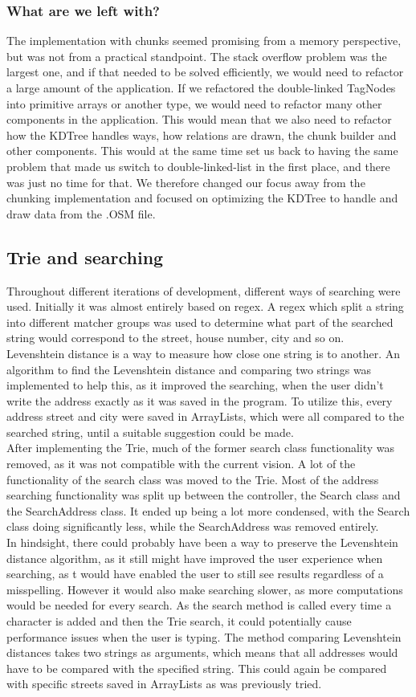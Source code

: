 \subsubsection{What are we left with?}
The implementation with chunks seemed promising from a memory perspective, but was not from a practical standpoint. The stack overflow problem was the largest one, and if that needed to be solved efficiently, we would need to refactor a large amount of the application. If we refactored the double-linked TagNodes into primitive arrays or another type, we would need to refactor many other components in the application. This would mean that we also need to refactor how the KDTree handles ways, how relations are drawn, the chunk builder and other components. This would at the same time set us back to having the same problem that made us switch to double-linked-list in the first place, and there was just no time for that. 
We therefore changed our focus away from the chunking implementation and focused on optimizing the KDTree to handle and draw data from the .OSM file. 
\subsection{Trie and searching}
Throughout different iterations of development, different ways of searching were used. Initially it was almost entirely based on regex. A regex which split a string into different matcher groups was used to determine what part of the searched string would correspond to the street, house number, city and so on. \\
Levenshtein distance is a way to measure how close one string is to another. An algorithm to find the Levenshtein distance and comparing two strings was implemented to help this, as it improved the searching, when the user didn’t write the address exactly as it was saved in the program. To utilize this, every address street and city were saved in ArrayLists, which were all compared to the searched string, until a suitable suggestion could be made. \\
After implementing the Trie, much of the former search class functionality was removed, as it was not compatible with the current vision. A lot of the functionality of the search class was moved to the Trie. Most of the address searching functionality was split up between the controller, the Search class and the SearchAddress class. It ended up being a lot more condensed, with the Search class doing significantly less, while the SearchAddress was removed entirely. \\
In hindsight, there could probably have been a way to preserve the Levenshtein distance algorithm, as it still might have improved the user experience when searching, as t would have enabled the user to still see results regardless of a misspelling. However it would also make searching slower, as more computations would be needed for every search. As the search method is called every time a character is added and then the Trie search, it could potentially cause performance issues when the user is typing. The method comparing Levenshtein distances takes two strings as arguments, which means that all addresses would have to be compared with the specified string. This could again be compared with specific streets saved in ArrayLists as was previously tried.
